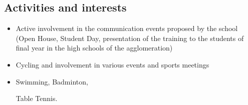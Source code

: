 \documentclass[9pt, oneside, a4paper, titlepage]{extarticle}
\begin{document}
\begin{tcolorbox}
\begin{minipage}[t]{6.2cm}
\begin{spacing}{0.95}
\begin{tcolorbox}[grow to left by = 0.6cm, colback = gray!25, colframe = white]
                \vspace*{0.2cm}
                \section*{Activities and interests}
                
                \begin{itemize}
                    \vspace*{0.3cm}
                    \item Active involvement in the communication events proposed 
                    by the school (Open House, Student Day, presentation of the 
                    training to the students of final year in the high schools of 
                    the agglomeration)
                    \vspace*{0.2cm}
                    \item Cycling and involvement in various events and sports meetings
                    \vspace*{0.2cm}
                    \item Swimming, Badminton, 
                    
                    Table Tennis.
                \end{itemize}

            \end{tcolorbox}
        \end{spacing}
        \end{minipage}
        \hspace*{0.4mm}
        \begin{minipage}[t]{12.8cm}
            \vspace*{-0.5cm}
            \begin{tcolorbox}[grow to right by = 0.6cm, colback = gray!25, colframe = white]

\end{tcolorbox}
\end{minipage}
\end{tcolorbox}
\end{document}
